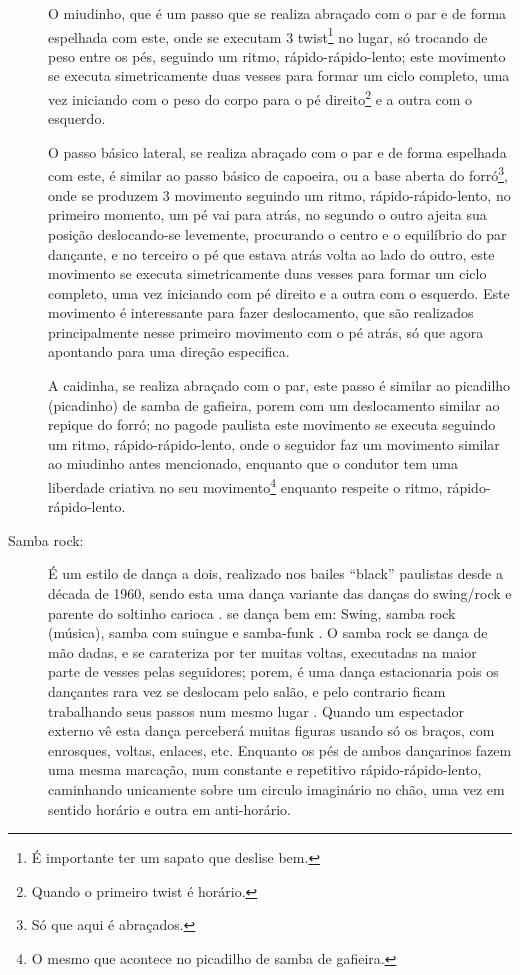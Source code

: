 \begin{description}
O miudinho, que é um passo que se realiza abraçado com o par e de forma espelhada com este,
onde se executam 3 twist\footnote{É importante ter um sapato que deslise bem.} no lugar, 
só trocando de peso entre os pés, seguindo um ritmo, rápido-rápido-lento;
este movimento se executa simetricamente duas vesses para formar um ciclo completo,  
uma vez iniciando com o peso do corpo para o pé direito\footnote{Quando o primeiro twist é horário.} e a outra com o esquerdo.

O passo básico lateral, se realiza abraçado com o par  e de forma espelhada com este, 
é similar ao passo básico de capoeira,
ou a base aberta do forró\footnote{Só que aqui é abraçados.},
onde se produzem 3 movimento seguindo um ritmo, rápido-rápido-lento,
no primeiro momento, um pé vai para atrás, 
no segundo o outro ajeita sua posição deslocando-se levemente, 
procurando o centro e o equilíbrio do par dançante, e
no terceiro o pé que estava atrás volta ao lado do outro,
este movimento se executa simetricamente duas vesses para formar um ciclo completo,  
uma vez iniciando com pé direito e a outra com o esquerdo.
Este movimento é interessante para fazer deslocamento, 
que são realizados principalmente nesse primeiro movimento com o pé atrás, 
só que agora apontando para uma direção especifica.

A caidinha, se realiza abraçado com o par, 
este passo é similar ao picadilho (picadinho) de samba de gafieira,
porem com um deslocamento similar ao repique do forró;
no pagode paulista este movimento se executa seguindo um ritmo, rápido-rápido-lento,
onde o seguidor faz um movimento similar ao miudinho antes mencionado,
enquanto que o condutor tem uma liberdade criativa no 
seu movimento\footnote{O mesmo que acontece no picadilho de samba de gafieira.} 
enquanto respeite o ritmo, rápido-rápido-lento.


\item[Samba rock:] 
É um estilo de dança a dois, realizado nos bailes ``black'' paulistas desde a década de 1960, 
sendo esta uma dança variante das danças do swing/rock e parente do soltinho carioca \cite[pp. 135]{perna2002samba}.
se dança bem em: Swing, samba rock (música), samba com suingue e samba-funk \cite[pp. 135,138]{perna2002samba}.
O samba rock se dança de mão dadas, e se carateriza por ter muitas voltas,
executadas na maior parte de vesses pelas  seguidores;
porem, é uma dança estacionaria pois os dançantes rara vez se deslocam pelo salão, 
e pelo contrario ficam trabalhando seus passos num mesmo lugar  \cite[pp. 135,138]{perna2002samba}.
Quando um espectador externo vê esta dança perceberá muitas figuras usando só os braços,
com enrosques, voltas, enlaces, etc.
Enquanto os pés de ambos dançarinos fazem uma mesma marcação, num constante e repetitivo rápido-rápido-lento,
caminhando unicamente sobre um circulo imaginário no chão, uma vez em sentido horário e outra em anti-horário.


\end{description}

